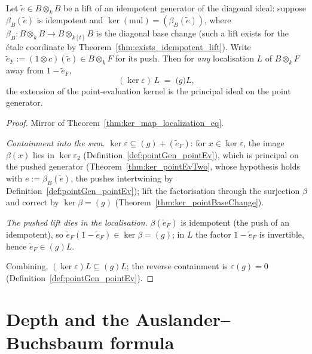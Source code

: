 \begin{theorem}
  \label{thm:ker_pointEv_map_localization_eq}
  \leanok
  Let \(\tilde e \in B \otimes_k B\) be a lift of an idempotent generator of the diagonal
  ideal: suppose \(\beta_B(\tilde e)\) is idempotent and
  \(\ker(\mathrm{mul}) = (\beta_B(\tilde e))\), where
  \(\beta_B \colon B \otimes_k B \to B \otimes_{k[t]} B\) is the diagonal base change (such
  a lift exists for the \'etale coordinate by Theorem~\ref{thm:exists_idempotent_lift}).
  Write \(\tilde e_F := (1 \otimes c)(\tilde e) \in B \otimes_k F\) for its push. Then for
  \emph{any} localisation \(L\) of \(B \otimes_k F\) away from \(1 - \tilde e_F\),
  \[
    (\ker \varepsilon)\, L \;=\; \bigl(g\bigr) L ,
  \]
  the extension of the point-evaluation kernel is the principal ideal on the point
  generator.
\end{theorem}
\begin{proof}
  \leanok
  Mirror of Theorem~\ref{thm:ker_map_localization_eq}.

  \emph{Containment into the sum.} \(\ker\varepsilon \subseteq (g) + (\tilde e_F)\): for
  \(x \in \ker\varepsilon\), the image \(\beta(x)\) lies in \(\ker\varepsilon_2\)
  (Definition~\ref{def:pointGen_pointEv}), which is principal on the pushed generator
  (Theorem~\ref{thm:ker_pointEvTwo}, whose hypothesis holds with
  \(e := \beta_B(\tilde e)\), the pushes intertwining by
  Definition~\ref{def:pointGen_pointEv}); lift the factorisation through the surjection
  \(\beta\) and correct by \(\ker\beta = (g)\) (Theorem~\ref{thm:ker_pointBaseChange}).

  \emph{The pushed lift dies in the localisation.} \(\beta(\tilde e_F)\) is idempotent (the
  push of an idempotent), so \(\tilde e_F (1 - \tilde e_F) \in \ker\beta = (g)\); in \(L\)
  the factor \(1 - \tilde e_F\) is invertible, hence \(\tilde e_F \in (g)L\).

  Combining, \((\ker\varepsilon)L \subseteq (g)L\); the reverse containment is
  \(\varepsilon(g) = 0\) (Definition~\ref{def:pointGen_pointEv}).
\end{proof}

\section{Depth and the Auslander--Buchsbaum formula}
\label{sec:auslander_buchsbaum}

